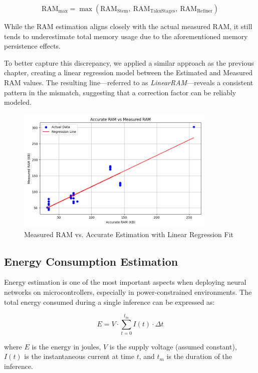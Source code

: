 \begin{equation}
\text{RAM}_{\text{max}} = \max\left( \text{RAM}_{\text{Stem}},\ \text{RAM}_{\text{TakuStages}},\ \text{RAM}_{\text{Refiner}} \right)
\label{eq:max_ram}
\end{equation}

While the RAM estimation aligns closely with the actual measured RAM, it still tends to underestimate total memory usage due to the aforementioned memory persistence effects.

To better capture this discrepancy, we applied a similar approach as the previous chapter, creating a linear regression model between the Estimated and Measured RAM values. The resulting line—referred to as \textit{LinearRAM}—reveals a consistent pattern in the mismatch, suggesting that a correction factor can be reliably modeled.

\begin{figure}[ht]
  \centering
  \includegraphics[width=0.85\textwidth]{Pictures/ram_accurate_vs_measured.png}
  \caption{Measured RAM vs. Accurate Estimation with Linear Regression Fit}
  \label{fig:ram-linear-regression}
\end{figure}

\subsection{Energy Consumption Estimation}

Energy estimation is one of the most important aspects when deploying neural networks on microcontrollers, especially in power-constrained environments. The total energy consumed during a single inference can be expressed as:

\[
E = V \cdot \sum_{t=0}^{t_m} I(t) \cdot \Delta t
\]

where \( E \) is the energy in joules, \( V \) is the supply voltage (assumed constant), \( I(t) \) is the instantaneous current at time \( t \), and \( t_m \) is the duration of the inference.

